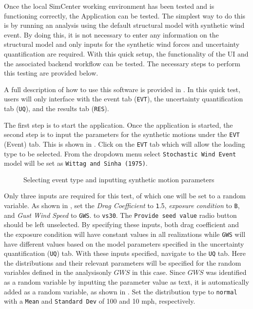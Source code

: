 Once the local SimCenter working environment has been tested and is
functioning correctly, the \texttt{\getsoftwarename{}} Application
can be tested. The simplest way to do this is by running an analysis
using the default structural model with synthetic wind event. By
doing this, it is not necessary to enter any information on the
structural model and only inputs for the synthetic wind forces 
and uncertainty quantification are required. With this quick setup, the
functionality of the \texttt{\getsoftwarename{}} UI and the associated backend
workflow can be tested. The necessary steps to perform this
testing are provided below.

A full description of how to use this software is provided
in .  In this quick test, users will only
interface with the event tab (\texttt{EVT}), the uncertainty
quantification tab (\texttt{UQ}), and the results tab (\texttt{RES}).

The first step is to start the \texttt{\getsoftwarename{}}
application.  Once the application is started, the second step is to
input the parameters for the synthetic motions under the \texttt{EVT}
(Event) tab. This is shown in . Click
on the \texttt{EVT} tab which will allow the loading type to be
selected. From the dropdown menu select \texttt{Stochastic Wind Event}
model will be set as \texttt{Wittag and Sinha (1975)}.

\begin{figure}[!htbp]
  \caption{Selecting event type and inputting synthetic motion parameters}
  \label{fig:input_event}
\end{figure}

Only three inputs are required for this test, of which one will be set
to a random variable. As shown in , set the
\emph{Drag Coefficient} to {\texttt 1.5}, \emph{exposure condition} to \texttt{B}, and \emph{Gust Wind Speed} to \texttt{GWS}.
to \texttt{vs30}. The \texttt{Provide seed value} radio button should
be left unselected. By specifying these inputs, both drag coefficient
and the exposure condition will have constant values in all
realizations while \texttt{GWS} will have different values based on
the model parameters specified in the uncertainty quantification
(\texttt{UQ}) tab. With these inputs specified, navigate to
the \texttt{UQ} tab. Here the distributions and their relevant
parameters will be specified for the random variables defined in the
analysis\textemdash only $GWS$ in this case. Since $GWS$ was
identified as a random variable by inputting the parameter value as
text, it is automatically added as a random variable, as shown
in . Set the distribution type to \texttt{normal}
with a \texttt{Mean} and \texttt{Standard Dev} of 100 and 10 mph,
respectively.


